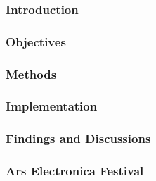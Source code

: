 \subsubsection {Introduction} 
\subsubsection {Objectives} 
\subsubsection {Methods}
\subsubsection {Implementation}
\subsubsection {Findings and Discussions}


\subsubsection{Ars Electronica Festival}

